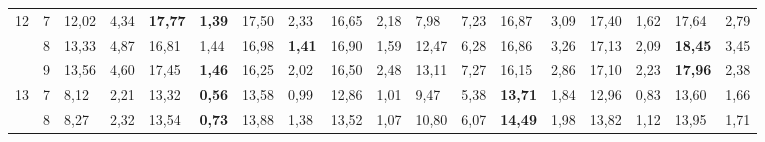 \documentclass[conference]{IEEEtran}
\begin{document}
\begin{table}[]
\begin{tabular}{|cl|ll|ll|ll|ll|ll|ll|ll|ll|}
		\multicolumn{1}{|c|}{\multirow{3}{*}{12}} & 7          & \multicolumn{1}{l|}{12,02}         & 4,34          & \multicolumn{1}{l|}{\textbf{17,77}} & \textbf{1,39} & \multicolumn{1}{l|}{17,50}          & 2,33          & \multicolumn{1}{l|}{16,65}         & 2,18          & \multicolumn{1}{l|}{7,98}                 & 7,23 & \multicolumn{1}{l|}{16,87}          & 3,09 & \multicolumn{1}{l|}{17,40}          & 1,62          & \multicolumn{1}{l|}{17,64}          & 2,79 \\ \cline{2-18} 
		\multicolumn{1}{|c|}{}                    & 8          & \multicolumn{1}{l|}{13,33}         & 4,87          & \multicolumn{1}{l|}{16,81}          & 1,44          & \multicolumn{1}{l|}{16,98}          & \textbf{1,41} & \multicolumn{1}{l|}{16,90}         & 1,59          & \multicolumn{1}{l|}{12,47}                & 6,28 & \multicolumn{1}{l|}{16,86}          & 3,26 & \multicolumn{1}{l|}{17,13}          & 2,09          & \multicolumn{1}{l|}{\textbf{18,45}} & 3,45 \\ \cline{2-18} 
		\multicolumn{1}{|c|}{}                    & 9          & \multicolumn{1}{l|}{13,56}         & 4,60          & \multicolumn{1}{l|}{17,45}          & \textbf{1,46} & \multicolumn{1}{l|}{16,25}          & 2,02          & \multicolumn{1}{l|}{16,50}         & 2,48          & \multicolumn{1}{l|}{13,11}                & 7,27 & \multicolumn{1}{l|}{16,15}          & 2,86 & \multicolumn{1}{l|}{17,10}          & 2,23          & \multicolumn{1}{l|}{\textbf{17,96}} & 2,38 \\ \hline
		\multicolumn{1}{|c|}{\multirow{3}{*}{13}} & 7          & \multicolumn{1}{l|}{8,12}          & 2,21          & \multicolumn{1}{l|}{13,32}          & \textbf{0,56} & \multicolumn{1}{l|}{13,58}          & 0,99          & \multicolumn{1}{l|}{12,86}         & 1,01          & \multicolumn{1}{l|}{9,47}                 & 5,38 & \multicolumn{1}{l|}{\textbf{13,71}} & 1,84 & \multicolumn{1}{l|}{12,96}          & 0,83          & \multicolumn{1}{l|}{13,60}          & 1,66 \\ \cline{2-18} 
		\multicolumn{1}{|c|}{}                    & 8          & \multicolumn{1}{l|}{8,27}          & 2,32          & \multicolumn{1}{l|}{13,54}          & \textbf{0,73} & \multicolumn{1}{l|}{13,88}          & 1,38          & \multicolumn{1}{l|}{13,52}         & 1,07          & \multicolumn{1}{l|}{10,80}                & 6,07 & \multicolumn{1}{l|}{\textbf{14,49}} & 1,98 & \multicolumn{1}{l|}{13,82}          & 1,12          & \multicolumn{1}{l|}{13,95}          & 1,71 \\ \cline{2-18} 

\end{tabular}
\end{table}
\end{document}
